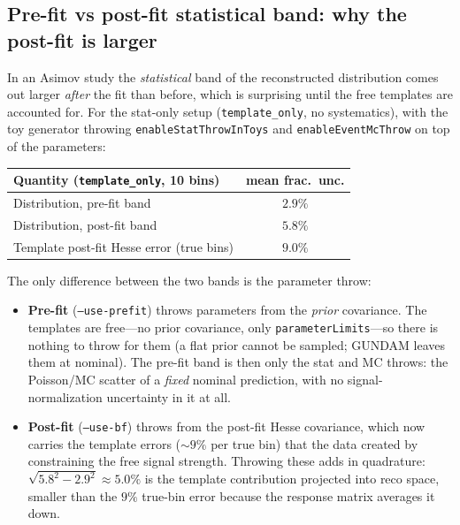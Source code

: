 \documentclass[11pt]{article}
\newcommand{\code}[1]{\texttt{#1}}
\begin{document}
\subsection{Pre-fit vs post-fit statistical band: why the post-fit is larger}

In an Asimov study the \emph{statistical} band of the reconstructed distribution
comes out larger \emph{after} the fit than before, which is surprising until the
free templates are accounted for. For the stat-only setup
(\code{template\_only}, no systematics), with the toy generator throwing
\code{enableStatThrowInToys} and \code{enableEventMcThrow} on top of the
parameters:

\begin{center}
\begin{tabular}{@{}lc@{}}
\toprule
Quantity (\code{template\_only}, 10 bins) & mean frac.\ unc. \\
\midrule
Distribution, pre-fit band                  & $2.9\%$ \\
Distribution, post-fit band                 & $5.8\%$ \\
Template post-fit Hesse error (true bins)   & $9.0\%$ \\
\bottomrule
\end{tabular}
\end{center}

The only difference between the two bands is the parameter throw:
\begin{itemize}
  \item \textbf{Pre-fit} (\code{--use-prefit}) throws parameters from the
    \emph{prior} covariance. The templates are free---no prior covariance, only
    \code{parameterLimits}---so there is nothing to throw for them (a flat prior
    cannot be sampled; GUNDAM leaves them at nominal). The pre-fit band is then
    only the stat and MC throws: the Poisson/MC scatter of a \emph{fixed} nominal
    prediction, with no signal-normalization uncertainty in it at all.
  \item \textbf{Post-fit} (\code{--use-bf}) throws from the post-fit Hesse
    covariance, which now carries the template errors ($\sim\!9\%$ per true bin)
    that the data created by constraining the free signal strength. Throwing
    these adds in quadrature: $\sqrt{5.8^2-2.9^2}\approx5.0\%$ is the template
    contribution projected into reco space, smaller than the $9\%$ true-bin error
    because the response matrix averages it down.
\end{itemize}
\end{document}
